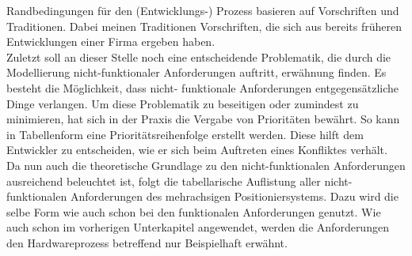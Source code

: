 \documentclass[../Bachelorarbeit.tex]{subfiles}
\begin{document}
Randbedingungen für den (Entwicklungs-) Prozess basieren auf Vorschriften und Traditionen. Dabei meinen Traditionen Vorschriften, die sich aus bereits früheren Entwicklungen einer Firma ergeben haben.\\ %
Zuletzt soll an dieser Stelle noch eine entscheidende Problematik, die durch die Modellierung nicht-funktionaler Anforderungen auftritt, erwähnung finden. Es besteht die Möglichkeit, dass nicht- funktionale Anforderungen entgegensätzliche Dinge verlangen. Um diese Problematik zu beseitigen oder zumindest zu minimieren, hat sich in der Praxis die Vergabe von Prioritäten bewährt. So kann in Tabellenform eine Prioritätsreihenfolge erstellt werden. Diese hilft dem Entwickler zu entscheiden, wie er sich beim Auftreten eines Konfliktes verhält.\\ %
Da nun auch die theoretische Grundlage zu den nicht-funktionalen Anforderungen ausreichend beleuchtet ist, folgt die tabellarische Auflistung aller nicht-funktionalen Anforderungen des mehrachsigen Positioniersystems. Dazu wird die selbe Form wie auch schon bei den funktionalen Anforderungen genutzt. Wie auch schon im vorherigen Unterkapitel angewendet, werden die Anforderungen den Hardwareprozess betreffend nur Beispielhaft erwähnt.
\end{document}
